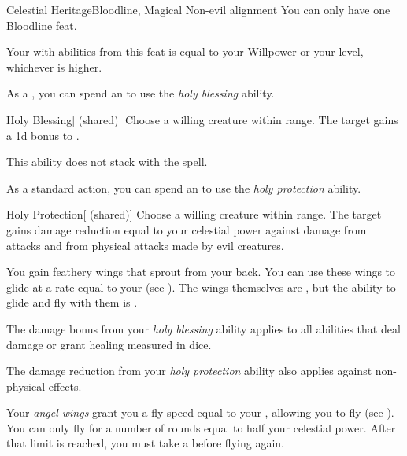     \begin{feat}{Celestial Heritage}{Bloodline, Magical}
        \featpre Non-evil alignment
         You can only have one Bloodline feat.

         Your  with abilities from this feat is equal to your Willpower or your level, whichever is higher.

         As a , you can spend an  to use the \textit{holy blessing} ability.
        \begin{ability}{Holy Blessing}[ (shared)]
            Choose a willing creature within \rngclose range.
            The target gains a \plus1d bonus to .

            This ability does not stack with the  spell.
        \end{ability}

         As a standard action, you can spend an  to use the \textit{holy protection} ability.
        \begin{ability}{Holy Protection}[ (shared)]
            Choose a willing creature within \rngclose range.
            The target gains damage reduction equal to your celestial power against damage from  attacks and from physical attacks made by evil creatures.
        \end{ability}

         You gain feathery wings that sprout from your back.
        You can use these wings to glide at a rate equal to your  (see ).
        The wings themselves are , but the ability to glide and fly with them is .

         The damage bonus from your \textit{holy blessing} ability applies to all abilities that deal damage or grant healing measured in dice.

         The damage reduction from your \textit{holy protection} ability also applies against non-physical effects.

         Your \textit{angel wings} grant you a fly speed equal to your , allowing you to fly (see ).
        You can only fly for a number of rounds equal to half your celestial power.
        After that limit is reached, you must take a  before flying again.


\end{feat}

